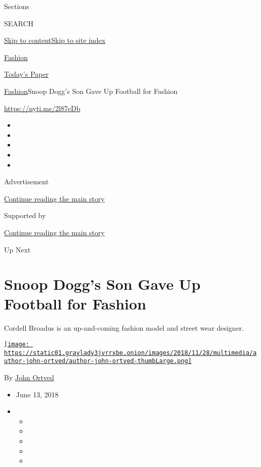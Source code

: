 Sections

SEARCH

\protect\hyperlink{site-content}{Skip to
content}\protect\hyperlink{site-index}{Skip to site index}

\href{https://www.nytimes3xbfgragh.onion/section/fashion}{Fashion}

\href{https://myaccount.nytimes3xbfgragh.onion/auth/login?response_type=cookie\&client_id=vi}{}

\href{https://www.nytimes3xbfgragh.onion/section/todayspaper}{Today's
Paper}

\href{/section/fashion}{Fashion}\textbar{}Snoop Dogg's Son Gave Up
Football for Fashion

\url{https://nyti.ms/2l87eDb}

\begin{itemize}
\item
\item
\item
\item
\item
\end{itemize}

Advertisement

\protect\hyperlink{after-top}{Continue reading the main story}

Supported by

\protect\hyperlink{after-sponsor}{Continue reading the main story}

Up Next

\hypertarget{snoop-doggs-son-gave-up-football-for-fashion}{%
\section{Snoop Dogg's Son Gave Up Football for
Fashion}\label{snoop-doggs-son-gave-up-football-for-fashion}}

Cordell Broadus is an up-and-coming fashion model and street wear
designer.

\href{https://www.nytimes3xbfgragh.onion/by/john-ortved}{\texttt{[image: https://static01.graylady3jvrrxbe.onion/images/2018/11/28/multimedia/author-john-ortved/author-john-ortved-thumbLarge.png]}}

By \href{https://www.nytimes3xbfgragh.onion/by/john-ortved}{John Ortved}

\begin{itemize}
\item
  June 13, 2018
\item
  \begin{itemize}
  \item
  \item
  \item
  \item
  \item
  \end{itemize}
\end{itemize}

